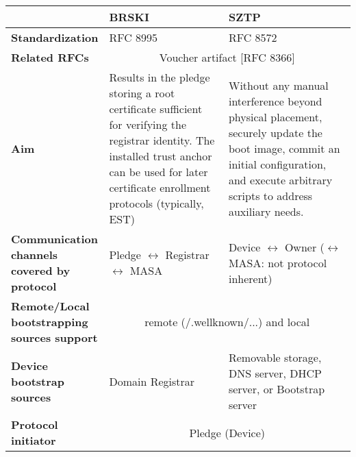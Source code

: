 
\begin{longtable}{|p{0.23\linewidth}|p{0.372\linewidth}|p{0.393\linewidth}|}
		\hline
		\rowcolor[rgb]{ .745,  .804,  .843}  & \textbf{BRSKI} & \textbf{SZTP} \\
		\hline
		\endhead

		\cellcolor[rgb]{ .745,  .804,  .843} \textbf{Standardization} &  RFC 8995 &  RFC 8572 \\

		\hline
		\cellcolor[rgb]{ .745,  .804,  .843} \textbf{Related RFCs} & \multicolumn{2}{c|}{ Voucher artifact [RFC 8366]} \\
		\hline

		\cellcolor[rgb]{ .745,  .804,  .843} \textbf{Aim} & Results in the pledge storing a root certificate sufficient for verifying the registrar identity. The installed trust anchor can be used for later certificate enrollment protocols (typically, EST) &  Without any manual interference beyond physical placement, securely update the boot image, commit an initial configuration, and execute arbitrary scripts to address auxiliary needs. \\

		\hline
		\cellcolor[rgb]{ .745,  .804,  .843} \textbf{Communication channels covered by protocol} &  Pledge $ \leftrightarrow $ Registrar $ \leftrightarrow $ MASA &  Device $ \leftrightarrow $ Owner ($ \leftrightarrow $ MASA: not protocol inherent) \\
		\hline

		\cellcolor[rgb]{ .745,  .804,  .843} \textbf{Remote/Local bootstrapping sources support} & \multicolumn{2}{c|}{   remote (/.wellknown/...) and local } \\

		\hline
		\cellcolor[rgb]{ .745,  .804,  .843} \textbf{Device bootstrap sources} &  Domain Registrar &  Removable storage, DNS server, DHCP server, or Bootstrap server \\

		\hline
		\cellcolor[rgb]{ .745,  .804,  .843} \textbf{Protocol initiator} & \multicolumn{2}{c|}{ Pledge (Device)} \\


\end{longtable}

